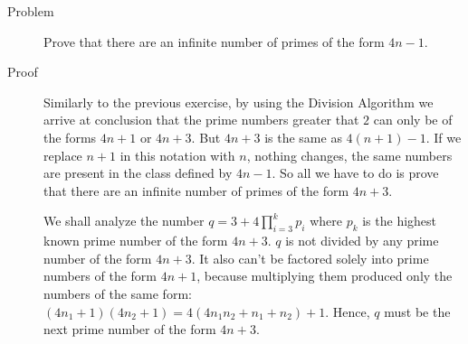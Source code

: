 \begin{description}
\item[Problem] Prove that there are an infinite number of primes of the form
$4n - 1$.

\item[Proof] Similarly to the previous exercise, by using the Division
Algorithm we arrive at conclusion that the prime numbers greater that $2$ can
only be of the forms $4n + 1$ or $4n + 3$. But $4n + 3$ is the same as $4(n+1)
-1$. If we replace $n+1$ in this notation with $n$, nothing changes, the same
numbers are present in the class defined by $4n-1$. So all we have to do is
prove that there are an infinite number of primes of the form $4n+3$.

We shall analyze the number $q = 3 + 4\prod_{i=3}^k p_i$ where $p_k$ is the
highest known prime number of the form $4n+3$. $q$ is not divided by any prime
number of the form $4n + 3$. It also can't be factored solely into prime
numbers of the form $4n + 1$, because multiplying them produced only the
numbers of the same form: $(4n_1+1)(4n_2+1) = 4 (4 n_1 n_2 + n_1 + n_2) + 1$.
Hence, $q$ must be the next prime number of the form $4n + 3$.

\end{description}
